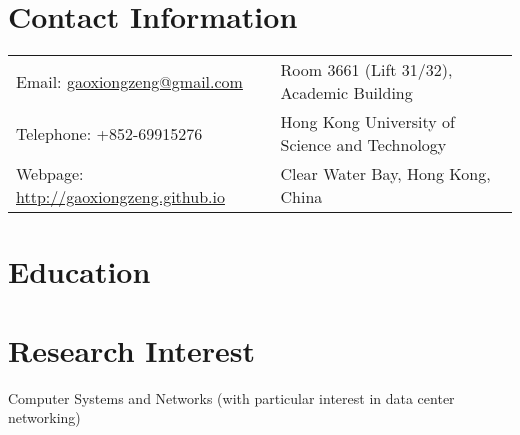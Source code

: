 \documentclass[10pt,a4paper,roman]{moderncv} %
\begin{document}
\makecvtitle %

\section{Contact Information}
\vspace{2mm}
\begin{tabular}{p{9cm} l}
Email: \href{mailto:gaoxiongzeng@gmail.com}{gaoxiongzeng@gmail.com} &  Room 3661 (Lift 31/32), Academic Building\\
Telephone: +852-69915276 & Hong Kong University of Science and Technology\\
Webpage: \textcolor{blue}{\url{http://gaoxiongzeng.github.io}} & Clear Water Bay, Hong Kong, China\\
\end{tabular}


\section{Education}
\vspace{2mm}
\vspace{3mm}


\section{Research Interest}
\vspace{2mm}
Computer Systems and Networks (with particular interest in data center networking)


\end{document}
